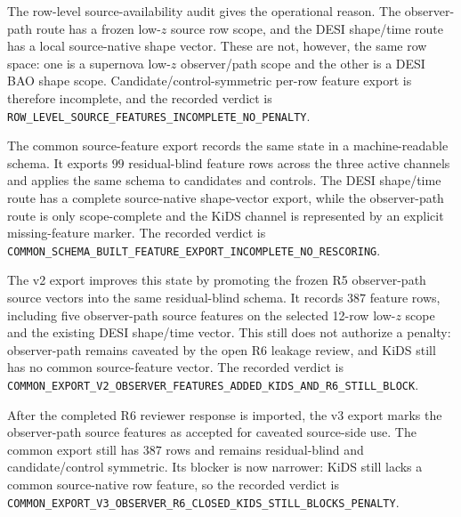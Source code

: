 \documentclass[11pt]{article}
\begin{document}
The row-level source-availability audit gives the operational reason.  The
observer-path route has a frozen low-\(z\) source row scope, and the DESI
shape/time route has a local source-native shape vector.  These are not,
however, the same row space: one is a supernova low-\(z\) observer/path scope
and the other is a DESI BAO shape scope.  Candidate/control-symmetric per-row
feature export is therefore incomplete, and the recorded verdict is
\texttt{ROW\_\allowbreak{}LEVEL\_\allowbreak{}SOURCE\_\allowbreak{}FEATURES\_\allowbreak{}INCOMPLETE\_\allowbreak{}NO\_\allowbreak{}PENALTY}.

The common source-feature export records the same state in a machine-readable
schema.  It exports \(99\) residual-blind feature rows across the three active
channels and applies the same schema to candidates and controls.  The DESI
shape/time route has a complete source-native shape-vector export, while the
observer-path route is only scope-complete and the KiDS channel is represented
by an explicit missing-feature marker.  The recorded verdict is
\texttt{COMMON\_\allowbreak{}SCHEMA\_\allowbreak{}BUILT\_\allowbreak{}FEATURE\_\allowbreak{}EXPORT\_\allowbreak{}INCOMPLETE\_\allowbreak{}NO\_\allowbreak{}RESCORING}.

The v2 export improves this state by promoting the frozen R5 observer-path
source vectors into the same residual-blind schema.  It records \(387\)
feature rows, including five observer-path source features on the selected
12-row low-\(z\) scope and the existing DESI shape/time vector.  This still
does not authorize a penalty: observer-path remains caveated by the open R6
leakage review, and KiDS still has no common source-feature vector.  The
recorded verdict is
\texttt{COMMON\_\allowbreak{}EXPORT\_\allowbreak{}V2\_\allowbreak{}OBSERVER\_\allowbreak{}FEATURES\_\allowbreak{}ADDED\_\allowbreak{}KIDS\_\allowbreak{}AND\_\allowbreak{}R6\_\allowbreak{}STILL\_\allowbreak{}BLOCK}.

After the completed R6 reviewer response is imported, the v3 export marks the
observer-path source features as accepted for caveated source-side use.  The
common export still has \(387\) rows and remains residual-blind and
candidate/control symmetric.  Its blocker is now narrower: KiDS still lacks a
common source-native row feature, so the recorded verdict is
\texttt{COMMON\_\allowbreak{}EXPORT\_\allowbreak{}V3\_\allowbreak{}OBSERVER\_\allowbreak{}R6\_\allowbreak{}CLOSED\_\allowbreak{}KIDS\_\allowbreak{}STILL\_\allowbreak{}BLOCKS\_\allowbreak{}PENALTY}.
\end{document}

